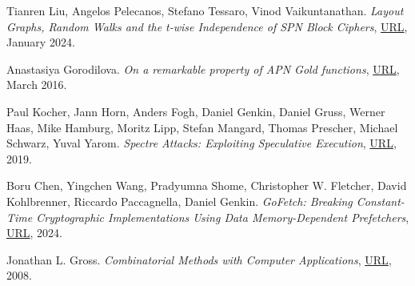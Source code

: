 \documentclass{Resources/UoBLab1}
\theoremstyle{definition}
\begin{document}
\begin{thebibliography}{10}
 Tianren Liu, Angelos Pelecanos, Stefano Tessaro, Vinod Vaikuntanathan. \textit{Layout Graphs, Random Walks and the t-wise Independence of SPN Block Ciphers}, \href{https://eprint.iacr.org/2024/083.pdf}{URL}, January 2024.

 Anastasiya Gorodilova. \textit{On a remarkable property of APN Gold functions}, \href{https://eprint.iacr.org/2016/286.pdf}{URL}, March 2016.

 Paul Kocher, Jann Horn, Anders Fogh, Daniel Genkin, Daniel Gruss, Werner Haas, Mike Hamburg, Moritz Lipp, Stefan Mangard, Thomas Prescher, Michael Schwarz, Yuval Yarom. \textit{Spectre Attacks: Exploiting Speculative Execution}, \href{https://spectreattack.com/spectre.pdf}{URL}, 2019.

 Boru Chen, Yingchen Wang, Pradyumna Shome, Christopher W. Fletcher, David Kohlbrenner, Riccardo Paccagnella, Daniel Genkin. \textit{GoFetch: Breaking Constant-Time Cryptographic Implementations Using Data Memory-Dependent Prefetchers}, \href{https://gofetch.fail/files/gofetch.pdf}{URL}, 2024.

 Jonathan L. Gross. \textit{Combinatorial Methods with Computer Applications}, \href{http://www.cs.columbia.edu/~cs4205/files/CM4.pdf}{URL}, 2008.

\end{thebibliography}
\end{document}
